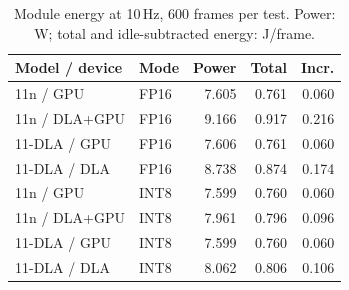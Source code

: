 \begin{table}[t]
\caption{Module energy at 10\,Hz, 600 frames per test. Power: W; total and idle-subtracted energy: J/frame.}
\label{tab:energy}\centering\footnotesize
\setlength{\tabcolsep}{3pt}
\begin{tabular*}{\columnwidth}{@{\extracolsep{\fill}}llrrr@{}}
\toprule
Model / device & Mode & Power & Total & Incr. \\
\midrule
11n / GPU & FP16 & 7.605 & 0.761 & 0.060 \\
11n / DLA+GPU & FP16 & 9.166 & 0.917 & 0.216 \\
11-DLA / GPU & FP16 & 7.606 & 0.761 & 0.060 \\
11-DLA / DLA & FP16 & 8.738 & 0.874 & 0.174 \\
\midrule
11n / GPU & INT8 & 7.599 & 0.760 & 0.060 \\
11n / DLA+GPU & INT8 & 7.961 & 0.796 & 0.096 \\
11-DLA / GPU & INT8 & 7.599 & 0.760 & 0.060 \\
11-DLA / DLA & INT8 & 8.062 & 0.806 & 0.106 \\
\bottomrule
\end{tabular*}
\end{table}
